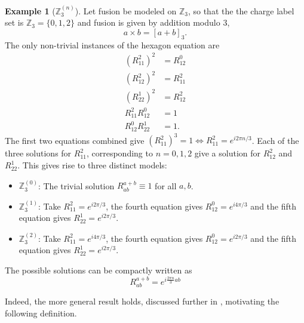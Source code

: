 \documentclass[a4paper,10pt,oneside]{book}
\theoremstyle{plain}
\theoremstyle{definition}
\newtheorem{example}{Example}[section]
\theoremstyle{remark}
\begin{document}
\begin{example}[$\mathbb{Z}_3^{(n)}$]
  Let fusion be modeled on $\mathbb{Z}_3$, so that the the charge label set is $\mathbb{Z}_3 = \{0, 1, 2\}$ and fusion is given by addition modulo 3,
  \begin{equation}
    a \times b = [a + b]_3.
  \end{equation}
  The only non-trivial instances of the hexagon equation are
  \begin{equation}
    \begin{aligned}
      \left( R_{11}^2 \right)^2 &= R_{12}^0 \\
      \left( R_{12}^2 \right)^2 &= R_{11}^2 \\
      \left( R_{22}^1 \right)^2 &= R_{12}^2 \\
      R_{11}^2 R_{12}^0 &= 1 \\
      R_{12}^0 R_{22}^1 &= 1.
    \end{aligned}
  \end{equation}
  The first two equations combined give $\left( R_{11}^2 \right)^3 = 1 \iff R_{11}^2 = e^{i2πn/3}$. Each of the three solutions for $R_{11}^2$, corresponding to $n = 0, 1, 2$ give a solution for $R_{12}^2$ and $R_{22}^1$. This gives rise to three distinct models:
  \begin{itemize}
    \item $\mathbb{Z}_3^{(0)}$: The trivial solution $R_{ab}^{a+b} \equiv 1$ for all $a, b$.
    \item $\mathbb{Z}_3^{(1)}$: Take $R_{11}^2 = e^{i2π/3}$, the fourth equation gives $R_{12}^0 = e^{i4π/3}$ and the fifth equation gives $R_{22}^1 = e^{i2π/3}$.
    \item $\mathbb{Z}_3^{(2)}$: Take $R_{11}^2 = e^{i4π/3}$, the fourth equation gives $R_{12}^0 = e^{i2π/3}$ and the fifth equation gives $R_{22}^1 = e^{i2π/3}$.
  \end{itemize}
  The possible solutions can be compactly written as
  \begin{equation}
    R_{ab}^{a+b} = e^{i\frac{2πn}{3}ab}
  \end{equation}
\end{example}

Indeed, the more general result holds, discussed further in \cite{bonderson}, motivating the following definition.
\end{document}
